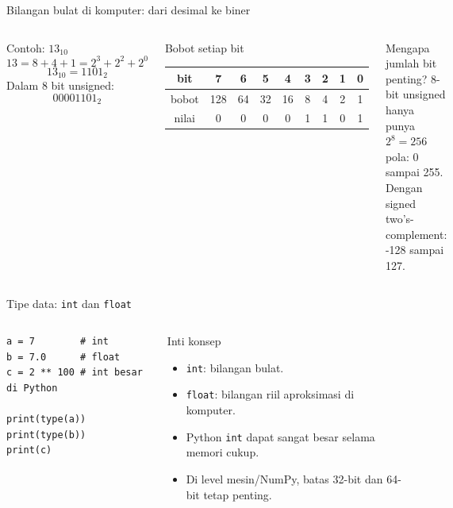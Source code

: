 \documentclass[aspectratio=169,11pt]{beamer}
\begin{document}
\begin{frame}{Bilangan bulat di komputer: dari desimal ke biner}
\begin{columns}[T]
\begin{block}{Contoh: $13_{10}$}
\[
13 = 8+4+1 = 2^3+2^2+2^0
\]
\[
13_{10}=1101_2
\]
Dalam 8 bit unsigned:
\[
\boxed{00001101_2}
\]
\end{block}
\begin{block}{Bobot setiap bit}
\centering
\begin{tabular}{c|cccccccc}
bit & 7&6&5&4&3&2&1&0\\\hline
bobot &128&64&32&16&8&4&2&1\\
nilai &0&0&0&0&1&1&0&1
\end{tabular}
\end{block}
\begin{block}{Mengapa jumlah bit penting?}
8-bit unsigned hanya punya $2^8=256$ pola: 0 sampai 255. Dengan signed two's-complement: -128 sampai 127.
\end{block}
\end{columns}
\end{frame}

\begin{frame}[fragile]{Tipe data: \texttt{int} dan \texttt{float}}
\begin{columns}[T]
\begin{lstlisting}[style=py]
a = 7        # int
b = 7.0      # float
c = 2 ** 100 # int besar di Python

print(type(a))
print(type(b))
print(c)
\end{lstlisting}
\begin{block}{Inti konsep}
\begin{itemize}
  \item \texttt{int}: bilangan bulat.
  \item \texttt{float}: bilangan riil aproksimasi di komputer.
  \item Python \texttt{int} dapat sangat besar selama memori cukup.
  \item Di level mesin/NumPy, batas 32-bit dan 64-bit tetap penting.
\end{itemize}
\end{block}
\end{columns}
\end{frame}
\end{document}
